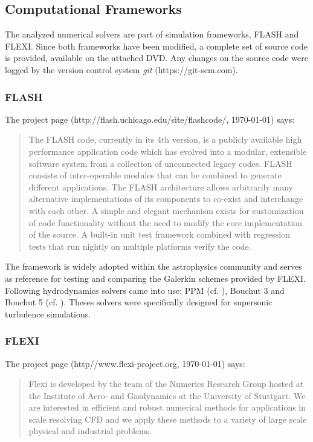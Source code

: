 \subsection{Computational Frameworks}
\label{sec:computational-frameworks}
The analyzed numerical solvers are part of simulation frameworks, FLASH and
FLEXI. Since both frameworks have been modified, a complete set of source code
is provided, available on the attached DVD. Any changes on the source code were
logged by the version control system \emph{git} (https://git-scm.com).

\subsubsection*{FLASH}
The project page (http://flash.uchicago.edu/site/flashcode/, \today) says:
\begin{quote}
The FLASH code, currently in its 4th version, is a publicly available high
performance application code which has evolved into a modular, extensible
software system from a collection of unconnected legacy codes. FLASH consists
of inter-operable modules that can be combined to generate different
applications. The FLASH architecture allows arbitrarily many alternative
implementations of its components to co-exist and interchange with each other.
A simple and elegant mechanism exists for customization of code functionality
without the need to modify the core implementation of the source. A built-in
unit test framework combined with regression tests that run nightly on multiple
platforms verify the code. 
\end{quote}

The framework is widely adopted within the astrophysics community and serves as
reference for testing and comparing the Galerkin schemes provided by FLEXI.
Following hydrodynamics solvers came into use: PPM (cf.
\cite{colella1984piecewise}), Bouchut 3 and Bouchut 5 (cf.
\cite{bouchut2007multiwave,bouchut2010multiwave}). Theses solvers were
specifically designed for supersonic turbulence simulations.

\subsubsection*{FLEXI}
The project page (http//www.flexi-project.org, \today) says:
\begin{quote}
Flexi is developed by the team of the Numerics Research Group hosted at the
Institute of Aero- and Gasdynamics at the University of Stuttgart. We are
interested in efficient and robust numerical methods for applications in scale
resolving CFD and we apply these methods to a variety of large scale
physical and industrial problems.
\end{quote}

